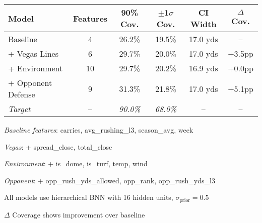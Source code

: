 \begin{threeparttable}
  \footnotesize
  \begin{tabular}{lccccc}
    \toprule
    \textbf{Model}  & \textbf{Features}  & \textbf{90\% Cov.}  & \textbf{$\pm$1$\sigma$ Cov.}  & \textbf{CI Width}  & \textbf{$\Delta$ Cov.} \\
    \midrule
    Baseline & 4 & 26.2\% & 19.5\% & 17.0 yds & -- \\
    + Vegas Lines & 6 & 29.7\% & 20.0\% & 17.0 yds & +3.5pp \\
    + Environment & 10 & 29.7\% & 20.2\% & 16.9 yds & +0.0pp \\
    + Opponent Defense & 9 & 31.3\% & 21.8\% & 17.0 yds & +5.1pp \\
    \midrule
    \textit{Target} & -- & \textit{90.0\%} & \textit{68.0\%} & -- & -- \\
    \bottomrule
  \end{tabular}
  \begin{tablenotes}[flushleft]\footnotesize
    \item \textit{Baseline features}: carries, avg\_rushing\_l3, season\_avg, week
    \item \textit{Vegas}: + spread\_close, total\_close
    \item \textit{Environment}: + is\_dome, is\_turf, temp, wind
    \item \textit{Opponent}: + opp\_rush\_yds\_allowed, opp\_rank, opp\_rush\_yds\_l3
    \item All models use hierarchical BNN with 16 hidden units, $\sigma_{\text{prior}} = 0.5$
    \item $\Delta$ Coverage shows improvement over baseline
  \end{tablenotes}
\end{threeparttable}
